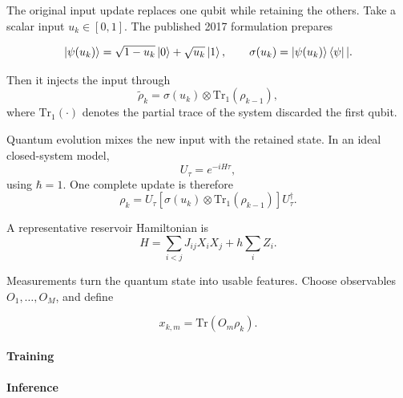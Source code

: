 \documentclass[10pt,article]{IEEEtran}
\begin{document}
The original input update replaces one qubit while retaining the others. Take a scalar input \(u_k\in[0,1]\). The published 2017 formulation prepares

\begin{equation}
    \ket{\psi(u_k)} = \sqrt{1-u_k}\ket{0}+\sqrt{u_k}\ket{1}, \qquad \sigma(u_k)=\ket{\psi(u_k)}\bra{\psi}|.
\end{equation}

Then it injects the input through
\begin{equation}
    \tilde{\rho}_k = \sigma(u_k) \otimes \text{Tr}_1(\rho_{k-1}),
\end{equation}
where \(\text{Tr}_1(\cdot)\) denotes the partial trace of the system discarded the first qubit.

Quantum evolution mixes the new input with the retained state. In an ideal closed-system model,
\begin{equation}
    U_\tau=e^{-iH\tau},
\end{equation}
using \(\hbar=1\). One complete update is therefore
\begin{equation}
    \rho_k = U_\tau \left[\sigma(u_k)\otimes \text{Tr}_1(\rho_{k-1})\right]U_{\tau}^\dagger.
\end{equation}

A representative reservoir Hamiltonian is
\begin{equation}
    H = \sum_{i<j}J_{ij}X_iX_j+h\sum_i Z_i.
\end{equation}

Measurements turn the quantum state into usable features. Choose observables \(O_1,\ldots,O_M\), and define

\begin{equation}
    x_{k, m} = \text{Tr}(O_m\rho_k).
\end{equation}

\paragraph{Training}

\paragraph{Inference}



\end{document}
